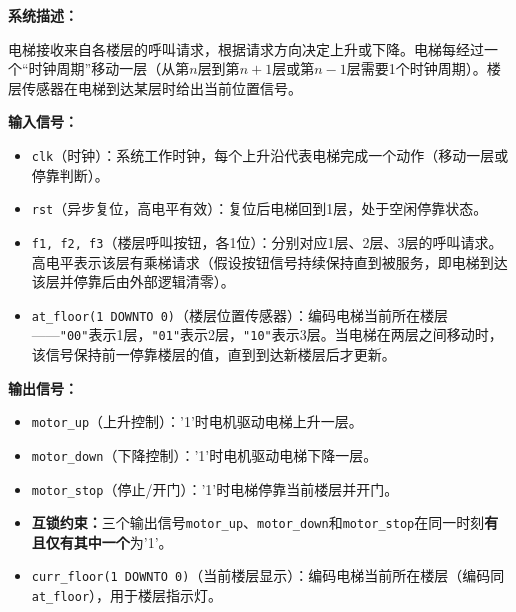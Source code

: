 \vspace{0.3cm}

\textbf{系统描述：}

电梯接收来自各楼层的呼叫请求，根据请求方向决定上升或下降。电梯每经过一个“时钟周期”移动一层（从第$n$层到第$n+1$层或第$n-1$层需要1个时钟周期）。楼层传感器在电梯到达某层时给出当前位置信号。

\vspace{0.3cm}

\textbf{输入信号：}
\begin{itemize}
  \item \texttt{clk}（时钟）：系统工作时钟，每个上升沿代表电梯完成一个动作（移动一层或停靠判断）。
  \item \texttt{rst}（异步复位，高电平有效）：复位后电梯回到1层，处于空闲停靠状态。
  \item \texttt{f1, f2, f3}（楼层呼叫按钮，各1位）：分别对应1层、2层、3层的呼叫请求。高电平表示该层有乘梯请求（假设按钮信号持续保持直到被服务，即电梯到达该层并停靠后由外部逻辑清零）。
  \item \texttt{at\_floor(1 DOWNTO 0)}（楼层位置传感器）：编码电梯当前所在楼层——\texttt{"00"}表示1层，\texttt{"01"}表示2层，\texttt{"10"}表示3层。当电梯在两层之间移动时，该信号保持前一停靠楼层的值，直到到达新楼层后才更新。
\end{itemize}

\vspace{0.3cm}

\textbf{输出信号：}
\begin{itemize}
  \item \texttt{motor\_up}（上升控制）：'1'时电机驱动电梯上升一层。
  \item \texttt{motor\_down}（下降控制）：'1'时电机驱动电梯下降一层。
  \item \texttt{motor\_stop}（停止/开门）：'1'时电梯停靠当前楼层并开门。
  \item \textbf{互锁约束：}三个输出信号\texttt{motor\_up}、\texttt{motor\_down}和\texttt{motor\_stop}在同一时刻\textbf{有且仅有其中一个}为'1'。
  \item \texttt{curr\_floor(1 DOWNTO 0)}（当前楼层显示）：编码电梯当前所在楼层（编码同\texttt{at\_floor}），用于楼层指示灯。
\end{itemize}

\vspace{0.3cm}

